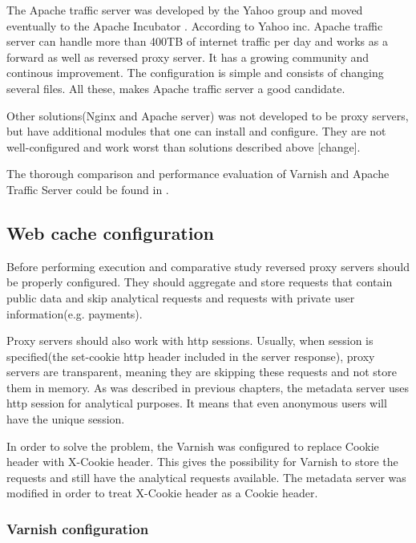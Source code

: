 The Apache traffic server was developed by the Yahoo group and moved eventually to the Apache Incubator \cite{GuApacheTrafficUri}. According to Yahoo inc. Apache traffic server can handle more than 400TB of internet traffic per day and works as a forward as well as reversed proxy server. It has a growing community and continous improvement. The configuration is simple and consists of changing several files. All these, makes Apache traffic server a good candidate.  

Other solutions(Nginx and Apache server) was not developed to be proxy servers, but have additional modules that one can install and configure. They are not well-configured and work worst than solutions described above \cite{GuApacheTrafficUri}[change].

The thorough comparison and performance evaluation of Varnish and Apache Traffic Server could be found in \cite{VarnApacheReverse}.    


\subsection{Web cache configuration}

Before performing execution and comparative study reversed proxy servers should be properly configured. They should aggregate and store requests that contain public data and skip analytical requests and requests with private user information(e.g. payments).

Proxy servers should also work with http sessions. Usually, when session is specified(the set-cookie http header included in the server response), proxy servers are transparent, meaning they are skipping these requests and not store them in memory. As was described in previous chapters, the metadata server uses http session for analytical purposes. It means that even anonymous users will have the unique session. 

In order to solve the problem, the Varnish was configured to replace Cookie header with X-Cookie header. This gives the possibility for Varnish to store the requests and still have the analytical requests available. The metadata server was modified in order to treat X-Cookie header as a Cookie header.   

\subsubsection{Varnish configuration}

